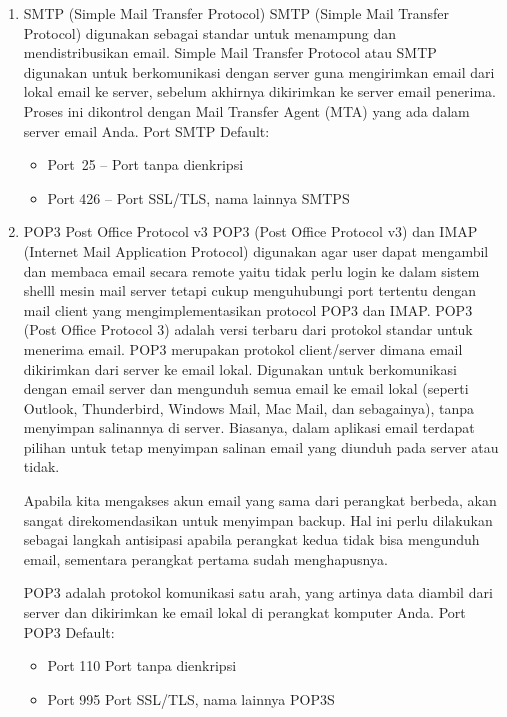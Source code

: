 	\begin{enumerate}
		\item  SMTP (Simple Mail Transfer Protocol) 
		 	SMTP (Simple Mail Transfer Protocol) digunakan sebagai standar untuk menampung dan mendistribusikan email. Simple Mail Transfer Protocol atau SMTP digunakan untuk berkomunikasi dengan server guna mengirimkan email dari lokal email ke server, sebelum akhirnya dikirimkan ke server email penerima. Proses ini dikontrol dengan Mail Transfer Agent (MTA) yang ada dalam server email Anda. Port SMTP Default:
			   
			\begin{itemize}
				\item Port~25 –  Port tanpa dienkripsi
				\item Port 426 – Port SSL/TLS, nama lainnya SMTPS
			\end{itemize}

		\item {POP3 Post Office Protocol v3}
			POP3 (Post Office Protocol v3) dan IMAP (Internet Mail Application Protocol) digunakan agar user dapat mengambil dan membaca email secara remote yaitu tidak perlu login ke dalam sistem shelll mesin mail server tetapi cukup menguhubungi port tertentu dengan mail client yang mengimplementasikan protocol POP3 dan IMAP.
			POP3 (Post Office Protocol 3) adalah versi terbaru dari protokol standar untuk menerima email. POP3 merupakan protokol client/server dimana email dikirimkan dari server ke email lokal. Digunakan untuk berkomunikasi dengan email server dan mengunduh semua email ke email lokal (seperti Outlook, Thunderbird, Windows Mail, Mac Mail, dan sebagainya), tanpa menyimpan salinannya di server. Biasanya, dalam aplikasi email terdapat pilihan untuk tetap menyimpan salinan email yang diunduh pada server atau tidak.

			Apabila kita mengakses akun email yang sama dari perangkat berbeda, akan sangat direkomendasikan untuk menyimpan backup. Hal ini perlu dilakukan sebagai langkah antisipasi apabila perangkat kedua tidak bisa mengunduh email, sementara perangkat pertama sudah menghapusnya. 

			POP3 adalah protokol komunikasi satu arah, yang artinya data diambil dari server dan dikirimkan ke email lokal di perangkat komputer Anda. 
Port POP3 Default:
			\begin{itemize}
			\item Port 110 Port tanpa dienkripsi
			\item Port 995 Port SSL/TLS, nama lainnya POP3S
			\end{itemize}
	\end{enumerate}

